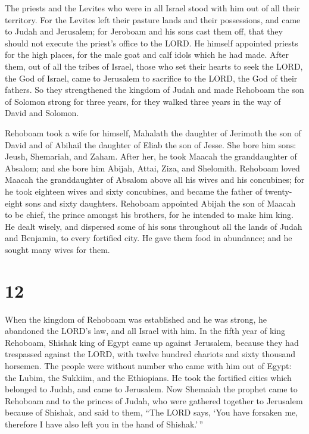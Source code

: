  The priests and the Levites who were in all Israel stood
with him out of all their territory.  For the Levites left
their pasture lands and their possessions, and came to Judah and
Jerusalem; for Jeroboam and his sons cast them off, that they should not
execute the priest's office to the LORD.  He himself
appointed priests for the high places, for the male goat and calf idols
which he had made.  After them, out of all the tribes of
Israel, those who set their hearts to seek the LORD, the God of Israel,
came to Jerusalem to sacrifice to the LORD, the God of their fathers.
 So they strengthened the kingdom of Judah and made
Rehoboam the son of Solomon strong for three years, for they walked
three years in the way of David and Solomon.

 Rehoboam took a wife for himself, Mahalath the daughter of
Jerimoth the son of David and of Abihail the daughter of Eliab the son
of Jesse.  She bore him sons: Jeush, Shemariah, and Zaham.
 After her, he took Maacah the granddaughter of Absalom;
and she bore him Abijah, Attai, Ziza, and Shelomith. 
Rehoboam loved Maacah the granddaughter of Absalom above all his wives
and his concubines; for he took eighteen wives and sixty concubines, and
became the father of twenty-eight sons and sixty daughters.
 Rehoboam appointed Abijah the son of Maacah to be chief,
the prince amongst his brothers, for he intended to make him king.
 He dealt wisely, and dispersed some of his sons throughout
all the lands of Judah and Benjamin, to every fortified city. He gave
them food in abundance; and he sought many wives for them.

\hypertarget{section-11}{%
\section{12}\label{section-11}}

 When the kingdom of Rehoboam was established and he was
strong, he abandoned the LORD's law, and all Israel with him.
 In the fifth year of king Rehoboam, Shishak king of Egypt
came up against Jerusalem, because they had trespassed against the LORD,
 with twelve hundred chariots and sixty thousand horsemen.
The people were without number who came with him out of Egypt: the
Lubim, the Sukkiim, and the Ethiopians.  He took the
fortified cities which belonged to Judah, and came to Jerusalem.
 Now Shemaiah the prophet came to Rehoboam and to the
princes of Judah, who were gathered together to Jerusalem because of
Shishak, and said to them, ``The LORD says, `You have forsaken me,
therefore I have also left you in the hand of Shishak.'\,''

